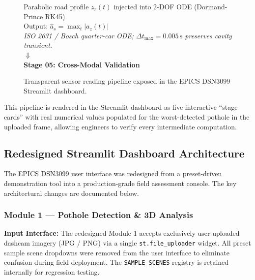 \begin{figure}[htbp]
\begin{tcolorbox}[colback=gray!5,colframe=gray!50,arc=1mm,title=\textbf{Sensor Reading Pipeline: 5-Stage Transparent Measurement Chain}]
\begin{center}
{{Parabolic road profile $z_r(t)$ injected into 2-DOF ODE (Dormand-Prince RK45)\\
Output: $\hat{a}_s = \max_t |a_z(t)|$\\
\textit{ISO 2631 / Bosch quarter-car ODE; $\Delta t_{\max} = 0.005\,\text{s}$ preserves cavity transient.}
}} \\[6pt]
$\Downarrow$ \\[6pt]
\textbf{Stage 05: Cross-Modal Validation}\\[4pt]
\end{center}
\end{tcolorbox}
\caption{Transparent sensor reading pipeline exposed in the EPICS DSN3099 Streamlit dashboard.}
\label{fig:sensor_pipeline}
\end{figure}

This pipeline is rendered in the Streamlit dashboard as five interactive ``stage cards'' with real numerical values populated for the worst-detected pothole in the uploaded frame, allowing engineers to verify every intermediate computation.

\subsection{Redesigned Streamlit Dashboard Architecture}

The EPICS DSN3099 user interface was redesigned from a preset-driven demonstration tool into a production-grade field assessment console. The key architectural changes are documented below.

\subsubsection{Module 1 --- Pothole Detection \& 3D Analysis}

\textbf{Input Interface:} The redesigned Module 1 accepts exclusively user-uploaded dashcam imagery (JPG / PNG) via a single \texttt{st.file\_uploader} widget. All preset sample scene dropdowns were removed from the user interface to eliminate confusion during field deployment. The \texttt{SAMPLE\_SCENES} registry is retained internally for regression testing.

